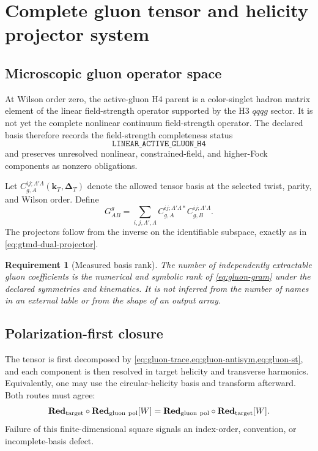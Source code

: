 \documentclass[11pt]{article}
\newtheorem{requirement}[definition]{Requirement}
\newcommand{\kT}{\bm{k}_{T}}
\newcommand{\DT}{\bm{\Delta}_{T}}
\newcommand{\Red}{\mathbf{Red}}
\begin{document}
\section{Complete gluon tensor and helicity projector system}
\label{sec:gluon-projectors}

\subsection{Microscopic gluon operator space}

At Wilson order zero, the active-gluon H4 parent is a color-singlet hadron
matrix element of the linear field-strength operator supported by the H3
\(qqqg\) sector.  It is not yet the complete nonlinear continuum field-strength
operator.  The declared basis therefore records the field-strength
completeness status
\begin{equation}
 \texttt{LINEAR\_ACTIVE\_GLUON\_H4}
 \end{equation}
and preserves unresolved nonlinear, constrained-field, and higher-Fock
components as nonzero obligations.

Let \(C_{g,A}^{ij;\Lambda'\Lambda}(\kT,\DT)\) denote the allowed tensor basis
at the selected twist, parity, and Wilson order.  Define
\begin{equation}
 G^{g}_{AB}
 =\sum_{i,j,\Lambda',\Lambda}
 C_{g,A}^{ij;\Lambda'\Lambda *}
 C_{g,B}^{ij;\Lambda'\Lambda}.
 \label{eq:gluon-gram}
\end{equation}
The projectors follow from the inverse on the identifiable subspace, exactly as
in \cref{eq:gtmd-dual-projector}.

\begin{requirement}[Measured basis rank]
\label{req:measured-gluon-rank}
The number of independently extractable gluon coefficients is the numerical
and symbolic rank of \cref{eq:gluon-gram} under the declared symmetries and
kinematics.  It is not inferred from the number of names in an external table
or from the shape of an output array.
\end{requirement}

\subsection{Polarization-first closure}

The tensor is first decomposed by \cref{eq:gluon-trace,eq:gluon-antisym,eq:gluon-st}, and each component is then resolved in target helicity and
transverse harmonics.  Equivalently, one may use the circular-helicity basis
and transform afterward.  Both routes must agree:
\begin{equation}
 \Red_{\rm target}\circ\Red_{\rm gluon\ pol}[W]
 =
 \Red_{\rm gluon\ pol}\circ\Red_{\rm target}[W].
 \label{eq:gluon-projector-commute}
\end{equation}
Failure of this finite-dimensional square signals an index-order, convention,
or incomplete-basis defect.
\end{document}
